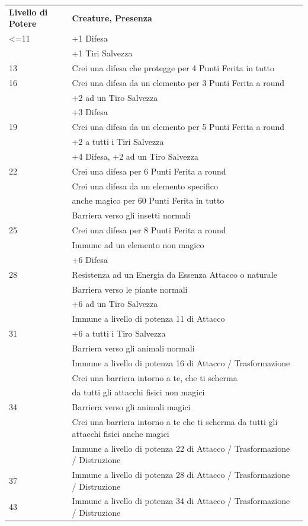 \documentclass[a4paper,11pt,twoside,openany]{book}
\begin{document}
\bigskip
\begin{tabularx}{0.95\textwidth}{lXl}
	\toprule
	\textbf{Livello di Potere} & \textbf{Creature, Presenza}\\
	<=11     & +1 Difesa  \\
	         & +1 Tiri Salvezza \\
	13       & Crei una difesa che protegge per 4 Punti Ferita in tutto \\
	16       & Crei una difesa da un elemento per 3 Punti Ferita a round\\
             & +2 ad un Tiro Salvezza\\
             & +3 Difesa\\
	19       & Crei una difesa da un elemento per 5 Punti Ferita a round\\
             & +2 a tutti i Tiri Salvezza   \\
             & +4 Difesa, +2 ad un Tiro Salvezza \\
	22       & Crei una difesa per 6 Punti Ferita a round \\
             & Crei una difesa da un elemento specifico \\
             & anche magico per 60 Punti Ferita in tutto \\
             & Barriera verso gli insetti normali \\
	25       & Crei una difesa per 8 Punti Ferita a round \\
             & Immune ad un elemento non magico \\
             & +6 Difesa \\
	28       & Resistenza ad un Energia da Essenza Attacco o naturale \\
             & Barriera verso le piante normali\\
             & +6 ad un Tiro Salvezza\\
             & Immune a livello di potenza 11 di Attacco\\
	31       & +6 a tutti i Tiro Salvezza\\
             & Barriera verso gli animali normali\\
             & Immune a livello di potenza 16 di Attacco / Trasformazione\\
             & Crei una barriera intorno a te, che ti scherma\\
             & da tutti gli attacchi fisici non magici\\
	34       & Barriera verso gli animali magici\\
	         & Crei una barriera intorno a te che ti scherma da tutti gli attacchi fisici anche magici\\
             & Immune a livello di potenza 22 di Attacco / Trasformazione / Distruzione \\
	37       & Immune a livello di potenza 28 di Attacco / Trasformazione / Distruzione \\
	43       & Immune a livello di potenza 34 di Attacco / Trasformazione / Distruzione \\
\end{tabularx}
\end{document}
